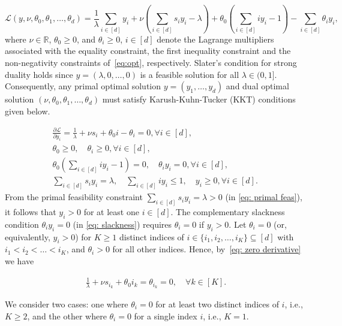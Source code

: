 \documentclass[a4paper]{article}
\theoremstyle{plain}
\theoremstyle{definition}
\theoremstyle{case}
\theoremstyle{remark}
\newcommand{\mb}[1]{\mathbb{#1}}
\newcommand{\brac}[1]{\left(#1\right)}
\begin{document}
\begin{equation*}
    \mathcal{L}\brac{y,\nu, \theta_0, \theta_1, \ldots, \theta_d} = \frac{1}{\lambda}\sum_{i \in [d]} y_i + \nu \brac{\sum_{i \in [d]} s_i y_i - \lambda}+ \theta_0 \brac{\sum_{i \in [d]} i y_i -1} - \sum_{i \in [d]} \theta_i y_i,    
\end{equation*}
%
where $\nu \in \mb R$, $\theta_0 \geq 0$, and $\theta_i \geq 0$, $i\in [d]$ denote the Lagrange multipliers associated with the equality constraint, the first inequality constraint and the non-negativity constraints of~\eqref{eq:opt}, respectively. Slater's condition for strong duality holds since $y = \brac{\lambda, 0, \ldots, 0}$ is a feasible solution for all $\lambda \in (0,1]$. Consequently, any primal optimal solution $y = \brac{y_1, \ldots, y_d}$ and dual optimal solution $\brac{\nu, \theta_0, \theta_1,\ldots,\theta_d}$ must satisfy Karush-Kuhn-Tucker (KKT) conditions given below.

\begin{align}
    &\frac{\partial{\mathcal{L}}}{\partial{y_i}} = \frac{1}{\lambda} + \nu s_i + \theta_0 i - \theta_i =0, \forall i \in [d],  \label{eq: zero derivative}
    \\ &\theta_0 \geq 0, \quad \theta_i \geq 0, \forall i \in [d], \quad   \label{eq: dual feas}
    \\& \theta_0 \brac{\sum_{i \in [d]} i y_i -1}=0, \quad \theta_i y_i=0, \forall i \in[d], \quad \label{eq: slackness}
    \\& \sum_{i \in [d]} s_i y_i  = \lambda, \quad \sum_{i \in [d]} i y_i \leq 1, \quad y_i \geq 0, \forall i \in [d]. \quad  \label{eq: primal feas}
\end{align}
%
From the primal feasibility constraint  $\sum_{i \in [d]} s_i y_i = \lambda >0$ (in \eqref{eq: primal feas}), it follows that $y_i>0$ for at least one $i \in [d]$. The complementary slackness condition $\theta_i y_i =0$ (in \eqref{eq: slackness}) requires  $\theta_i=0$ if $y_i >0$. Let $\theta_i =0$ (or, equivalently, $y_i > 0$) for $K \geq 1$ distinct indices of $i \in \{i_1,i_2,\ldots,i_K\} \subseteq [d]$ with $i_1 < i_2 < \ldots <i_K$, and $\theta_i >0$ for all other indices. Hence, by~\eqref{eq: zero derivative} we have

\begin{align} \label{eq: zero thetai}
    \frac{1}{\lambda}+ \nu s_{i_k} + \theta_0 i_k = \theta_{i_k} = 0, \quad \forall k \in [K].
\end{align}
%

We consider two cases: one where $\theta_i = 0$ for at least two distinct indices of $i$, i.e., $K \geq 2$, and the other where $\theta_i = 0$ for a single index $i$, i.e., $K=1$. 
\end{document}
